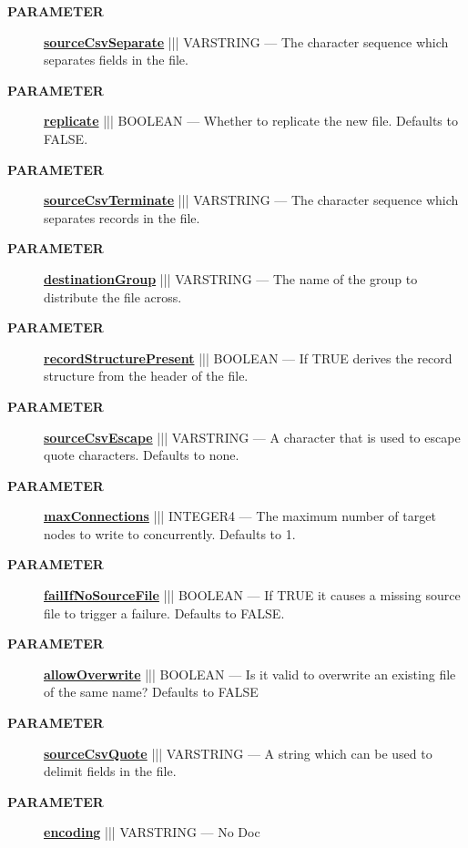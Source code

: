 \begin{description}
\item [\colorbox{tagtype}{\color{white} \textbf{\textsf{PARAMETER}}}] \textbf{\underline{sourceCsvSeparate}} ||| VARSTRING --- The character sequence which separates fields in the file.
\item [\colorbox{tagtype}{\color{white} \textbf{\textsf{PARAMETER}}}] \textbf{\underline{replicate}} ||| BOOLEAN --- Whether to replicate the new file. Defaults to FALSE.
\item [\colorbox{tagtype}{\color{white} \textbf{\textsf{PARAMETER}}}] \textbf{\underline{sourceCsvTerminate}} ||| VARSTRING --- The character sequence which separates records in the file.
\item [\colorbox{tagtype}{\color{white} \textbf{\textsf{PARAMETER}}}] \textbf{\underline{destinationGroup}} ||| VARSTRING --- The name of the group to distribute the file across.
\item [\colorbox{tagtype}{\color{white} \textbf{\textsf{PARAMETER}}}] \textbf{\underline{recordStructurePresent}} ||| BOOLEAN --- If TRUE derives the record structure from the header of the file.
\item [\colorbox{tagtype}{\color{white} \textbf{\textsf{PARAMETER}}}] \textbf{\underline{sourceCsvEscape}} ||| VARSTRING --- A character that is used to escape quote characters. Defaults to none.
\item [\colorbox{tagtype}{\color{white} \textbf{\textsf{PARAMETER}}}] \textbf{\underline{maxConnections}} ||| INTEGER4 --- The maximum number of target nodes to write to concurrently. Defaults to 1.
\item [\colorbox{tagtype}{\color{white} \textbf{\textsf{PARAMETER}}}] \textbf{\underline{failIfNoSourceFile}} ||| BOOLEAN --- If TRUE it causes a missing source file to trigger a failure. Defaults to FALSE.
\item [\colorbox{tagtype}{\color{white} \textbf{\textsf{PARAMETER}}}] \textbf{\underline{allowOverwrite}} ||| BOOLEAN --- Is it valid to overwrite an existing file of the same name? Defaults to FALSE
\item [\colorbox{tagtype}{\color{white} \textbf{\textsf{PARAMETER}}}] \textbf{\underline{sourceCsvQuote}} ||| VARSTRING --- A string which can be used to delimit fields in the file.
\item [\colorbox{tagtype}{\color{white} \textbf{\textsf{PARAMETER}}}] \textbf{\underline{encoding}} ||| VARSTRING --- No Doc
\end{description}







